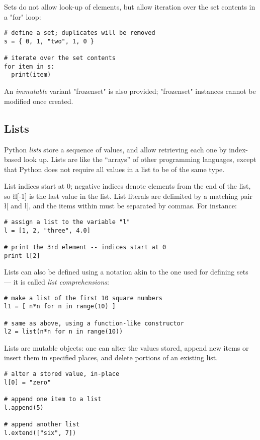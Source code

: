 {Sets do not allow look-up of elements, but allow iteration over the set
contents in a "for" loop:
\begin{lstlisting}
# define a set; duplicates will be removed
s = { 0, 1, "two", 1, 0 }

# iterate over the set contents
for item in s:
  print(item)
\end{lstlisting}

An \emph{immutable} variant "frozenset" is also provided;
"frozenset" instances cannot be modified once created.

                                                               
\subsection{Lists}
\label{sec:lists}

Python \emph{lists} store a sequence of values, and allow retrieving
each one by index-based look up.  Lists are like the ``arrays'' of
other programming languages, except that Python does not require all
values in a list to be of the same type.

List indices start at 0; negative indices denote elements from the end
of the list, so \l{l[-1]} is the last value in the list.  List
literals are delimited by a matching pair \l{[} and \l{]}, and the
items within must be separated by commas. For instance:
\begin{lstlisting}
# assign a list to the variable "l"
l = [1, 2, "three", 4.0]

# print the 3rd element -- indices start at 0
print l[2]
\end{lstlisting}
Lists can also be defined using a notation akin to the one used for
defining sets --- it is called \emph{list comprehensions}:
\begin{lstlisting}
# make a list of the first 10 square numbers
l1 = [ n*n for n in range(10) ]

# same as above, using a function-like constructor
l2 = list(n*n for n in range(10))
\end{lstlisting}

Lists are mutable objects: one can alter the values stored, append new
items or insert them in specified places, and delete portions of an
existing list.
\begin{lstlisting}
# alter a stored value, in-place
l[0] = "zero"

# append one item to a list
l.append(5)

# append another list
l.extend(["six", 7])


\end{lstlisting}}
